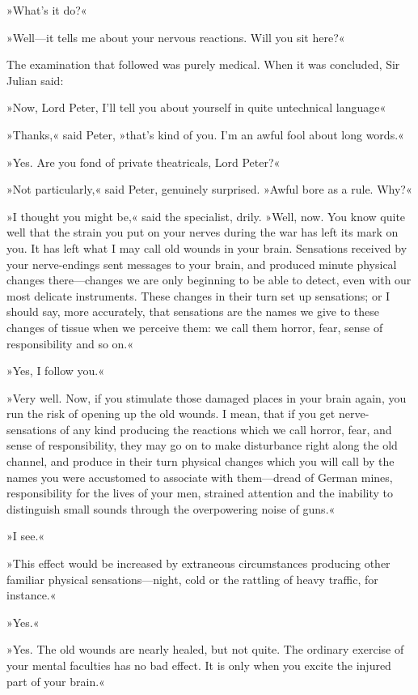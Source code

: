 »What's it do?«

»Well—it tells me about your nervous reactions. Will you sit here?«

The examination that followed was purely medical. When it was concluded, Sir Julian said:

»Now, Lord Peter, I'll tell you about yourself in quite untechnical language\longdash«

»Thanks,« said Peter, »that's kind of you. I'm an awful fool about long words.«

»Yes. Are you fond of private theatricals, Lord Peter?«

»Not particularly,« said Peter, genuinely surprised. »Awful bore as a rule. Why?«

»I thought you might be,« said the specialist, drily. »Well, now. You know quite well that the strain you put on your nerves during the war has left its mark on you. It has left what I may call old wounds in your brain. Sensations received by your nerve-endings sent messages to your brain, and produced minute physical changes there—changes we are only beginning to be able to detect, even with our most delicate instruments. These changes in their turn set up sensations; or I should say, more accurately, that sensations are the names we give to these changes of tissue when we perceive them: we call them horror, fear, sense of responsibility and so on.«

»Yes, I follow you.«

»Very well. Now, if you stimulate those damaged places in your brain again, you run the risk of opening up the old wounds. I mean, that if you get nerve-sensations of any kind producing the reactions which we call horror, fear, and sense of responsibility, they may go on to make disturbance right along the old channel, and produce in their turn physical changes which you will call by the names you were accustomed to associate with them—dread of German mines, responsibility for the lives of your men, strained attention and the inability to distinguish small sounds through the overpowering noise of guns.«

»I see.«

»This effect would be increased by extraneous circumstances producing other familiar physical sensations—night, cold or the rattling of heavy traffic, for instance.«

»Yes.«

»Yes. The old wounds are nearly healed, but not quite. The ordinary exercise of your mental faculties has no bad effect. It is only when you excite the injured part of your brain.«

